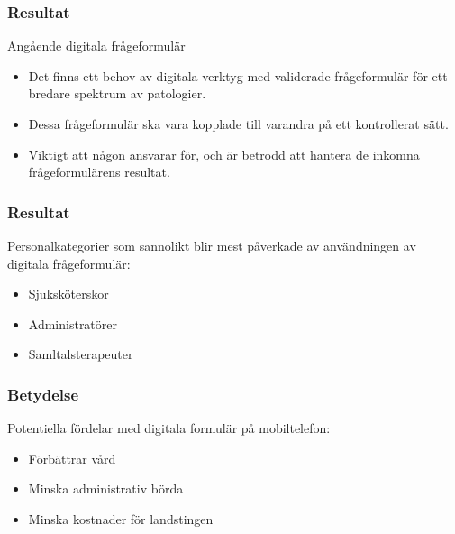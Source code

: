 \documentclass[english]{beamer}
\begin{document}
\begin{frame}
\frametitle{Resultat}
Ang{\aa}ende digitala fr{\aa}geformul{\"a}r
\begin{itemize}
\item Det finns ett behov av digitala verktyg med validerade fr{\aa}geformul{\"a}r f{\"o}r ett bredare spektrum av patologier.
\item  Dessa fr{\aa}geformul{\"a}r ska vara kopplade till varandra p{\aa} ett kontrollerat s{\"a}tt. 
\item  Viktigt att n{\aa}gon ansvarar f{\"o}r, och {\"a}r betrodd att hantera de inkomna fr{\aa}geformul{\"a}rens resultat. 
\end{itemize}
\end{frame}

\begin{frame}
\frametitle{Resultat}
Personalkategorier som sannolikt blir mest p{\aa}verkade av anv{\"a}ndningen av digitala fr{\aa}geformul{\"a}r:
\begin{itemize}\vspace{-.33em}
\item Sjuksk{\"o}terskor
\item Administrat{\"o}rer
\item Samltalsterapeuter

\end{itemize}
\end{frame}


\begin{frame}
\frametitle{Betydelse}
Potentiella f{\"o}rdelar med digitala formul{\"a}r p{\aa} mobiltelefon:
\begin{itemize}\vspace{-.33em}
\item F{\"o}rb{\"a}ttrar v{\aa}rd
\item Minska administrativ b{\"o}rda
\item Minska kostnader f{\"o}r landstingen
\end{itemize}
\end{frame}
\end{document}
